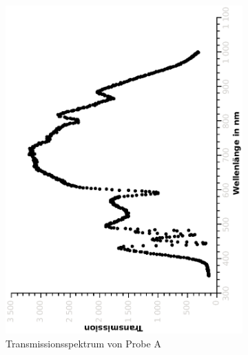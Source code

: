 \documentclass{article}
\begin{document}
\begin{figure}[H]
\begin{subfigure}[h]{0.4\textwidth}
\includegraphics[width=\textwidth ,angle=-90]{eps/probeAtrans.eps}
\caption{Transmissionsspektrum von Probe A}
\end{subfigure}
\begin{subfigure}[h]{0.4\textwidth}

\end{subfigure}
\end{figure}
\end{document}
